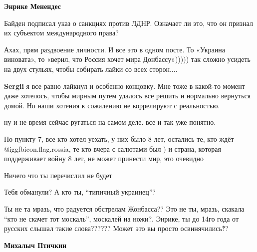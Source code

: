  
 
 
 
 
\zzSecCmt

\begin{itemize} %
\textbf{Энрике Менендес} 

Байден подписал указ о санкциях против ЛДНР. Означает ли это, что он признал их
субъектом международного права?



Ахах, прям раздвоение личности. И все это в одном посте. То «Украина виновата»,
то «верил, что Россия хочет мира Донбассу»))))) так сложно усидеть на двух
стульях, чтобы собирать лайки со всех сторон....

\begin{itemize} %
\textbf{Sergii} я все равно лайкнул и особенно концовку. Мне тоже в какой-то момент даже
хотелось, чтобы мирным путем удалось все решить и нормально вернуться домой. Но
наши хотения к сожалению не коррелируют с реальностью.


ну и не время сейчас ругаться на самом деле. все и так уже понятно.
\end{itemize} %


По пункту 7, все кто хотел уехать, у них было 8 лет, остались те, кто ждёт
@igg{fbicon.flag.rossia}, те кто вчера с салютами был ) и страна, которая поддерживает войну 8
лет, не может принести мир, это очевидно

Ничего что ты перечислил не будет

Тебя обманули? А кто ты, \enquote{типичный украинец}?

\begin{itemize} %

Ты не та мразь, что радуется обстрелам Жонбасса?? Это не ты, мразь, скакала
\enquote{кто не скачет тот москаль}, москалей на ножи?. Энрике, ты до 14го года от
русских слышал такие слова?????? Может это вы просто освинячились‽?


\textbf{Михалыч Птичкин} 


\end{itemize}
\end{itemize}
